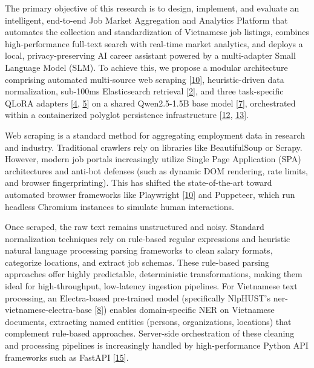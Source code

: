 \documentclass[12pt, a4paper]{report}
\begin{document}
The primary objective of this research is to design, implement, and evaluate an intelligent, end-to-end Job Market Aggregation and Analytics Platform that automates the collection and standardization of Vietnamese job listings, combines high-performance full-text search with real-time market analytics, and deploys a local, privacy-preserving AI career assistant powered by a multi-adapter Small Language Model (SLM). To achieve this, we propose a modular architecture comprising automated multi-source web scraping [\hyperlink{cite10}{10}], heuristic-driven data normalization, sub-100ms Elasticsearch retrieval [\hyperlink{cite2}{2}], and three task-specific QLoRA adapters [\hyperlink{cite4}{4}, \hyperlink{cite5}{5}] on a shared Qwen2.5-1.5B base model [\hyperlink{cite7}{7}], orchestrated within a containerized polyglot persistence infrastructure [\hyperlink{cite12}{12}, \hyperlink{cite13}{13}].

\vspace{0.8cm}
\vspace{0.4cm}

\vspace{0.4cm}

Web scraping is a standard method for aggregating employment data in research and industry. Traditional crawlers rely on libraries like BeautifulSoup or Scrapy. However, modern job portals increasingly utilize Single Page Application (SPA) architectures and anti-bot defenses (such as dynamic DOM rendering, rate limits, and browser fingerprinting). This has shifted the state-of-the-art toward automated browser frameworks like Playwright [\hyperlink{cite10}{10}] and Puppeteer, which run headless Chromium instances to simulate human interactions.

Once scraped, the raw text remains unstructured and noisy. Standard normalization techniques rely on rule-based regular expressions and heuristic natural language processing parsing frameworks to clean salary formats, categorize locations, and extract job schemas. These rule-based parsing approaches offer highly predictable, deterministic transformations, making them ideal for high-throughput, low-latency ingestion pipelines. For Vietnamese text processing, an Electra-based pre-trained model (specifically NlpHUST's ner-vietnamese-electra-base [\hyperlink{cite8}{8}]) enables domain-specific NER on Vietnamese documents, extracting named entities (persons, organizations, locations) that complement rule-based approaches. Server-side orchestration of these cleaning and processing pipelines is increasingly handled by high-performance Python API frameworks such as FastAPI [\hyperlink{cite15}{15}].
\end{document}
